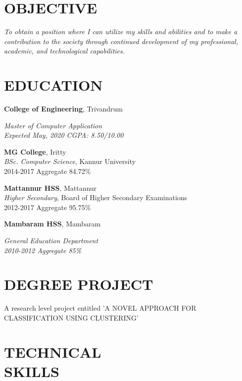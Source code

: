 \documentclass[margin]{res}
\begin{document}
\begin{resume}

\section{OBJECTIVE}
{\sl To obtain a position where I can utilize my skills and abilities and to make a contribution
to the society through continued development of my professional, academic, and technological
capabilities. }

\section{EDUCATION}
\textbf{College of Engineering}, Trivandrum\\
{\sl Master of Computer Application\\
Expected May, 2020
\hfill CGPA: 8.50/10.00

\textbf{MG College}, Iritty \\
{\sl BSc. Computer Science}, Kannur University\\
2014-2017
\hfill Aggregate 84.72\%

\textbf{Mattannur HSS}, Mattannur \\
{\sl Higher Secondary}, Board of Higher
Secondary Examinations\\
2012-2017
\hfill Aggregate 95.75\%

\textbf{Mambaram HSS}, Mambaram \\
{\sl General Education
Department\\
2010-2012
\hfill Aggregate 85\%





\section{DEGREE PROJECT} 
A research level project entitled 'A NOVEL APPROACH FOR CLASSIFICATION USING CLUSTERING'
\section{TECHNICAL\\SKILLS}

}}
\end{resume}
\end{document}
